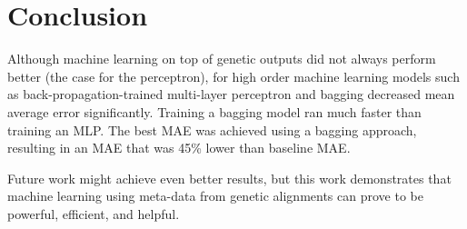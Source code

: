 \section {Conclusion}
\label{conclusion}

Although machine learning on top of genetic outputs did not always perform better (the case for the perceptron), for high order machine learning models such as back-propagation-trained multi-layer perceptron and bagging decreased mean average error significantly. Training a bagging model ran much faster than training an MLP.  The best MAE was achieved using a bagging approach, resulting in an MAE that was 45\% lower than baseline MAE.

Future work might achieve even better results, but this work demonstrates that machine learning using meta-data from genetic alignments can prove to be powerful, efficient, and helpful.